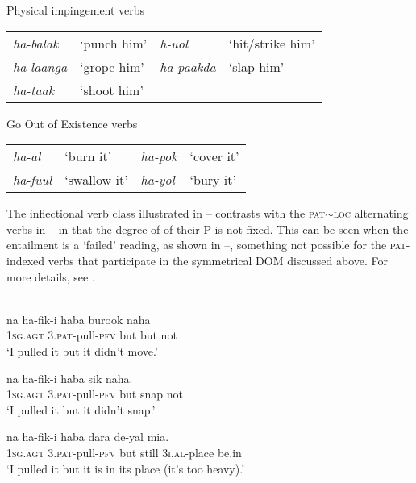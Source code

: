 \documentclass[output=paper]{LSP/langsci}
\begin{document}
\ea \label{03-kl-ex:35}
Physical impingement verbs \citep[224]{Kratochviletal2015Degrees}\\
\begin{tabularx}{\textwidth}{llll}
\textit{ha-balak} & ‘punch him’ & \textit{h-uol} & ‘hit/strike him’\\
\textit{ha-laanga} & ‘grope him’ & \textit{ha-paakda} & ‘slap him’\\
\textit{ha-taak} & ‘shoot him’\\
\end{tabularx}
\z

\ea \label{03-kl-ex:36}
Go Out of Existence verbs \citep[224]{Kratochviletal2015Degrees}\\
\begin{tabularx}{\textwidth}{llll}
\textit{ha-al} & ‘burn it’ & \textit{ha-pok} & ‘cover it’\\
\textit{ha-fuul} & ‘swallow it’ & \textit{ha-yol} & ‘bury it’\\
\end{tabularx}
\z

The inflectional verb class illustrated in -- contrasts with the \textsc{pat}{$\sim$}\textsc{loc} alternating verbs in -- in that the degree of  of their P is not fixed. This can be seen when the entailment is a `failed' reading, as shown in --, something not possible for the \textsc{pat}-indexed verbs that participate in the symmetrical DOM discussed above. For more details, see \citet{Kratochviletal2015Degrees}.


 



\ea {}\\
\ea \label{03-kl-ex:37}
\gll na ha-fik-i haba burook naha\\
1\textsc{sg}.\textsc{agt} 3.\textsc{pat}-pull-\textsc{pfv} but but not\\
\glt ‘I pulled it but it didn’t move.’ 

\ex \label{03-kl-ex:38}
\gll na	ha-fik-i	haba	sik	naha.\\
1\textsc{sg}.\textsc{agt}	3.\textsc{pat}-pull-\textsc{pfv}	but	snap	not\\
\glt ‘I pulled it but it didn’t snap.’

\ex \label{03-kl-ex:39}
\gll na	ha-fik-i	haba	dara	de-yal	mia.\\
1\textsc{sg}.\textsc{agt}	3.\textsc{pat}-pull-\textsc{pfv}	but	still	3\textsc{i.al}-place	be.in\\
\glt ‘I pulled it but it is in its place (it’s too heavy).’ 
\z
\z
 
\end{document}
